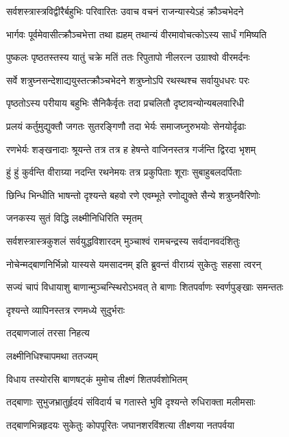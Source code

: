 \twolineshloka
{सर्वशस्त्रास्त्रविद्वीरैर्बहुभिः परिवारितः}
{उवाच वचनं राजन्यास्येऽहं क्रौञ्चभेदने}%

\twolineshloka
{भार्गवः पूर्वमेवासीत्क्रौञ्चभेत्ता तथा ह्यहम्}
{तथान्यं वीरमावोचत्कोऽस्य सार्धं गमिष्यति}%

\twolineshloka
{पुष्कलः पृष्ठतस्तस्य यातुं चक्रे मतिं ततः}
{रिपुतापो नीलरत्न उग्राश्वो वीरमर्दनः}%

\twolineshloka
{सर्वे शत्रुघ्नसन्देशाद्ययुस्तत्क्रौञ्चभेदने}
{शत्रुघ्नोऽपि रथस्थश्च सर्वायुधधरः परः}%

\twolineshloka
{पृष्ठतोऽस्य परीयाय बहुभिः सैनिकैर्वृतः}
{तदा प्रचलितौ दृष्टावन्योन्यबलवारिधी}%

\twolineshloka
{प्रलयं कर्तुमुद्युक्तौ जगतः सुतरङ्गिणौ}
{तदा भेर्यः समाजघ्नुरुभयोः सेनयोर्दृढाः}%

\twolineshloka
{रणभेर्यः शङ्खनादाः श्रूयन्ते तत्र तत्र ह}
{हेषन्ते वाजिनस्तत्र गर्जन्ति द्विरदा भृशम्}%

\twolineshloka
{हुं हुं कुर्वन्ति वीराग्र्या नदन्ति रथनेमयः}
{तत्र प्रकुपिताः शूराः सुबाहुबलदर्पिताः}%

\twolineshloka
{छिन्धि भिन्धीति भाषन्तो दृश्यन्ते बहवो रणे}
{एवम्भूते रणोद्युक्ते सैन्ये शत्रुघ्नवैरिणोः}%



\onelineshloka
{जनकस्य सुतं विद्धि लक्ष्मीनिधिरिति स्मृतम्}%

\twolineshloka
{सर्वशस्त्रास्त्रकुशलं सर्वयुद्धविशारदम्}
{मुञ्चाश्वं रामचन्द्रस्य सर्वदानवदंशितुः}%

\twolineshloka
{नोचेन्मद्बाणनिर्भिन्नो यास्यसे यमसादनम्}
{इति ब्रुवन्तं वीराग्र्यं सुकेतुः सहसा त्वरन्}%

\twolineshloka
{सज्यं चापं विधायाशु बाणान्मुञ्चन्स्थिरोऽभवत्}
{ते बाणाः शितपर्वाणः स्वर्णपुङ्खाः समन्ततः}%

दृश्यन्ते व्यापिनस्तत्र रणमध्ये सुदुर्भराः

तद्बाणजालं तरसा निहत्य

लक्ष्मीनिधिश्चापमथा ततज्यम्

\twolineshloka
{विधाय तस्योरसि बाणषट्कं}
{मुमोच तीक्ष्णं शितपर्वशोभितम्}%

\twolineshloka
{तद्बाणाः सुभुजभ्रातुर्हृदयं संविदार्य च}
{गतास्ते भुवि दृश्यन्ते रुधिराक्ता मलीमसाः}%

\twolineshloka
{तद्बाणभिन्नहृदयः सुकेतुः कोपपूरितः}
{जघानशरविंशत्या तीक्ष्णया नतपर्वया}%

